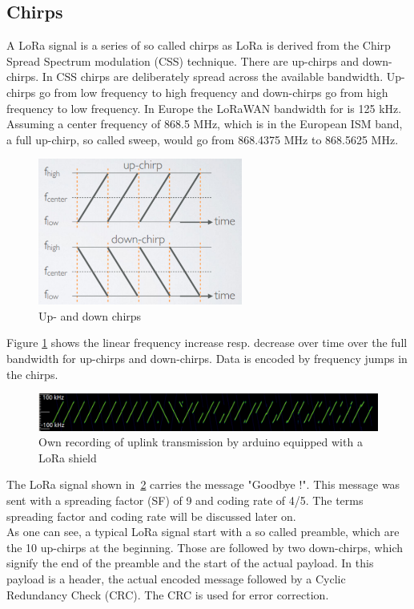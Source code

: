 \subsection{Chirps}
A LoRa signal is a series of so called chirps as LoRa is derived from the Chirp Spread Spectrum modulation (CSS) technique. 
There are up-chirps and down-chirps. In CSS chirps are deliberately spread across the available bandwidth. Up-chirps go from low frequency 
to high frequency and down-chirps go from high frequency to low frequency. In Europe the LoRaWAN bandwidth for is 125 kHz. Assuming a center
frequency of 868.5 MHz, which is in the European ISM band, a full up-chirp, so called sweep, would go from 868.4375 MHz to 868.5625 MHz.

\begin{figure}[h]
    \centering
    \includegraphics[width=0.6\textwidth]{figures/chirp_mobilefish.png}
    \caption{Up- and down chirps~\cite{lora_chirp_mobilefish}}
    \label{fig:chirp_mobilefish}
\end{figure}

Figure \ref{fig:chirp_mobilefish} shows the linear frequency increase resp. decrease over time over the full bandwidth
for up-chirps and down-chirps. Data is encoded by frequency jumps in the chirps. 

\begin{figure}[h]
    \centering
    \includegraphics[width=1\textwidth]{figures/signal_Goodbye!_SF9_CR4_5.png}
    \caption{Own recording of uplink transmission by arduino equipped with a LoRa shield}
    \label{fig:Goodbye}
\end{figure}

The LoRa signal shown in~\ref{fig:Goodbye} carries the message  "Goodbye !". This message was sent 
with a spreading factor (SF) of 9 and coding rate of 4/5. The terms spreading factor and coding rate 
will be discussed later on.\\
As one can see, a typical LoRa signal start with a so called preamble, which are the 10 up-chirps at 
the beginning. Those are followed by two down-chirps, which signify the end of the preamble and the start 
of the actual payload. In this payload is a header, the actual encoded message followed by a Cyclic Redundancy Check (CRC).
The CRC is used for error correction.
